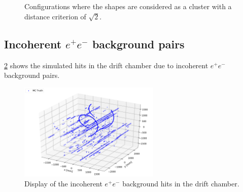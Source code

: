 \begin{figure}[ht]
	\begin{framed}
	\centering
	\begin{subfigure}[b]{0.3\textwidth}
  \end{subfigure}
		~ %
	\centering
	\begin{subfigure}[b]{0.3\textwidth}
		\end{subfigure}
			~ %
	\centering
	\begin{subfigure}[b]{0.3\textwidth}
		\end{subfigure}
		\end{framed}
	\label{fig_clushape}
	\caption{Configurations where the shapes are considered as a cluster with a distance criterion of $\sqrt{2}$.}
\end{figure}


\subsection{Incoherent $e^+e^-$ background pairs}

\cref{fig_bcg} shows the simulated hits in the drift chamber due to incoherent $e^+e^-$ background pairs.

\begin{figure}[ht]
	\centering
	\includegraphics[width=0.6\textwidth]{figures/3D_background.pdf}%
	\caption{Display of the incoherent $e^+e^-$ background hits in the drift chamber.}
	\label{fig_bcg}
\end{figure}

